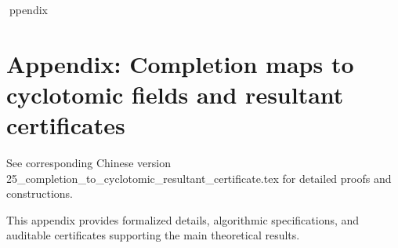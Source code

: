 ppendix

\section*{Appendix: Completion maps to cyclotomic fields and resultant certificates}

See corresponding Chinese version 25_completion_to_cyclotomic_resultant_certificate.tex for detailed proofs and constructions.

This appendix provides formalized details, algorithmic specifications, and auditable certificates supporting the main theoretical results.
